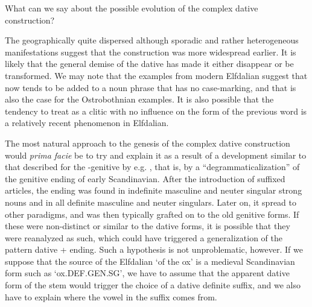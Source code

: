 {{%

What can we say about the possible evolution of the complex dative construction? 


The geographically quite dispersed although sporadic and rather heterogeneous manifestations suggest that the construction was more widespread earlier. It is likely that the general demise of the dative has made it either disappear or be transformed. We may note that the examples from modern Elfdalian suggest that now tends to be added to a noun phrase that has no case-marking, and that is also the case for the Ostrobothnian examples. It is also possible that the tendency to treat  as a clitic with no influence on the form of the previous word is a relatively recent phenomenon in Elfdalian.  


The most natural approach to the genesis of the complex dative construction would \textit{prima facie} be to try and explain it as a result of a development similar to that described for the -genitive by e.g. \citet{Norde1997}, that is, by a “degrammaticalization” of the genitive ending of early Scandinavian. After the introduction of suffixed articles, the ending was found in indefinite masculine and neuter singular strong nouns and in all definite masculine and neuter singulars. Later on, it spread to other paradigms, and was then typically grafted on to the old genitive forms. If these were non-distinct or similar to the dative forms, it is possible that they were reanalyzed as such, which could have triggered a generalization of the pattern dative + ending. Such a hypothesis is not unproblematic, however. If we suppose that the source of the Elfdalian  ‘of the ox’ is a medieval Scandinavian form such as  ‘ox.DEF.GEN.SG’, we have to assume that the apparent dative form of the stem would trigger the choice of a dative definite suffix, and we also have to explain where the vowel in the suffix comes from. 

}}
